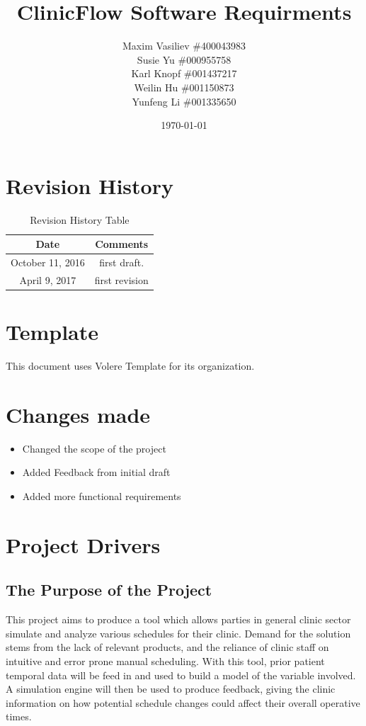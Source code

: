 \documentclass[12pt, titlepage]{article}
\begin{document}
\title{ClinicFlow Software Requirments} 
\author{Maxim Vasiliev \#400043983 \\ Susie Yu \#000955758\\ Karl Knopf \#001437217 \\ Weilin Hu \#001150873 \\ Yunfeng Li \#001335650}
\date{\today}
\maketitle

\tableofcontents 

\listoffigures

\listoftables
\pagebreak

\begin{table}[H]
\section*{Revision History}
\begin{tabular}{|c|c|}
\hline
\textbf{Date}  & \textbf{Comments} \\ \hline
October 11, 2016 &  first draft. \\ 
April 9, 2017 & first revision \\
\hline
\end{tabular}
\caption{Revision History Table}
\end{table}

\section*{Template}
This document uses Volere Template for its organization.
\pagebreak

\section{Changes made}
\begin{itemize}
 \item Changed the scope of the project
 \item Added Feedback from initial draft
 \item Added more functional requirements
\end{itemize}

\section{Project Drivers}

\subsection{The Purpose of the Project}
This project aims to produce a tool which allows parties in general clinic sector simulate and analyze various schedules for their clinic. Demand for the solution stems from the lack of relevant products, and the reliance of clinic staff on intuitive and error prone manual scheduling. With this tool, prior patient temporal data will be feed in and used to build a model of the variable involved. A simulation engine will then be used to produce feedback, giving the clinic information on how potential schedule changes could affect their overall operative times.
\end{document}

